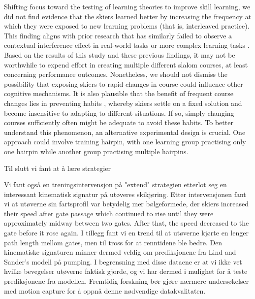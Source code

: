 Shifting focus toward the testing of learning theories to improve skill learning, we did not find evidence that the skiers learned better by increasing the frequency at which they were exposed to new learning problems (that is, interleaved practice). This finding aligns with prior research that has similarly failed to observe a contextual interference effect in real-world tasks or more complex learning tasks \cite{brady_theoretical_1998, barreiros_contextual_2007, wulf_principles_2002}. Based on the results of this study and these previous findings, it may not be worthwhile to expend effort in creating multiple different slalom courses, at least concerning performance outcomes. Nonetheless, we should not dismiss the possibility that exposing skiers to rapid changes in course could influence other cognitive mechanisms. It is also plausible that the benefit of frequent course changes lies in preventing habits \cite{du_relationship_2022}, whereby skiers settle on a fixed solution and become insensitive to adapting to different situations. If so, simply changing courses sufficiently often might be adequate to avoid these habits. To better understand this phenomenon, an alternative experimental design is crucial. One approach could involve training hairpin, with one learning group practising only one hairpin while another group practising multiple hairpins.

Til slutt vi fant at å lære strategier 
 














Vi fant også en treningsintervensjon på "extend" strategien etterlot seg en interessant kinematisk signatur på utøveres skikjøring. Etter intervensjonen fant vi at utøverne sin fartsprofil var betydelig mer bølgeformede, der skiers increased their speed after gate passage which continued to rise until they were approximately midway between two gates. After that, the speed decreased to the gate before it rose again. I tillegg fant vi en trend til at utøverne kjørte en lenger path length mellom gates, men til tross for at renntidene ble bedre. Den kinematiske signaturen minner dermed veldig om prediksjonene fra Lind and Sander's modell på pumping. I begrensning med disse dataene er at vi ikke vet hvilke bevegelser utøverne faktisk gjorde, og vi har dermed i mulighet for å teste prediksjonene fra modellen. Fremtidig forskning bør gjøre nærmere undersøkelser med motion capture for å oppnå denne nødvendige datakvalitaten.















